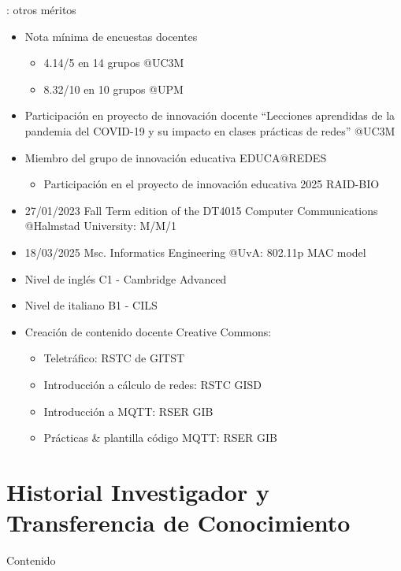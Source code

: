 \documentclass[xcolor=table,xcolor=x11names]{beamer}
\begin{document}
\begin{frame}[allowframebreaks]{\secname: otros méritos}
    \begin{itemize}
        \item Nota mínima de encuestas docentes 
            \begin{itemize}
                \item 4.14/5 en 14 grupos @UC3M
                \item 8.32/10 en 10 grupos @UPM
            \end{itemize}
        \item Participación en proyecto de innovación docente
            ``Lecciones aprendidas de la pandemia del COVID-19 y su impacto en clases prácticas de redes'' @UC3M
        \item Miembro del grupo de innovación educativa
            EDUCA@REDES
        \begin{itemize}
            \item Participación en el proyecto de innovación
                educativa 2025 RAID-BIO
        \end{itemize}
        \item 27/01/2023 Fall Term edition of the DT4015 Computer Communications @Halmstad University: M/M/1
        \item 18/03/2025 Msc. Informatics Engineering @UvA: 802.11p MAC model 
        \item Nivel de inglés C1 - Cambridge Advanced
        \item Nivel de italiano B1 - CILS
        \item Creación de contenido docente Creative Commons:
            \begin{itemize}
                \item Teletráfico: RSTC de GITST
                \item Introducción a cálculo de redes: RSTC GISD
                \item Introducción a MQTT: RSER GIB
                \item Prácticas \& plantilla código MQTT: RSER GIB
            \end{itemize}
    \end{itemize}

\end{frame}








\section{Historial Investigador y Transferencia de Conocimiento}
\begin{frame}[allowframebreaks]{Contenido}
    \tableofcontents[currentsection]
\end{frame}
\end{document}
